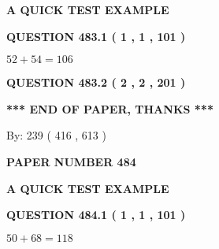 \documentclass[12pt]{article}
\begin{document}
   
   
   
 \vspace{0.2in}
{\LARGE {\textbf{ A QUICK TEST EXAMPLE}}}
   
   
  
\vspace{0.2in}
  
{\textbf{\Large{QUESTION
483.1 
 ( 1 , 1 , 101 )
}}}
  
  
 
 

$ %
52 +  %
54=   %
106$
 
 
  
\vspace{0.2in}
  
{\textbf{\Large{QUESTION
483.2 
 ( 2 , 2 , 201 )
}}}
  
  
   
   
 \vspace{0.2in}
 
   
   
   
   
\vspace{1.0in} 
{\textbf{\large{ *** END OF PAPER, THANKS *** }}} 
   
   
\hspace{1.0in} By: 
 239 ( 416 ,  613 )
   
   
   
   
\newpage 
\setcounter{page}{ 
   484001 } 
   
   
   
   
 {\textbf{ \Large{ PAPER NUMBER  484  }}}
   
   
\vspace{0.2in}
   
   
   
   
   
   
 \vspace{0.2in}
{\LARGE {\textbf{ A QUICK TEST EXAMPLE}}}
   
   
  
\vspace{0.2in}
  
{\textbf{\Large{QUESTION
484.1 
 ( 1 , 1 , 101 )
}}}
  
  
 
 

$ %
50 +  %
68=   %
118$
 
 
  
\vspace{0.2in}
  
\end{document}
